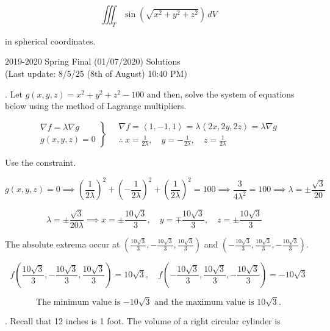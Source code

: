 \documentclass{article}
\begin{document}
\[\iiint_T\sin\left(\sqrt{x^2+y^2+z^2}\right)\,dV\]

\hfill

\noindent in spherical coordinates.

\newpage

\begin{center}
2019-2020 Spring Final (01/07/2020) Solutions\\
(Last update: 8/5/25 (8th of August) 10:40 PM)
\end{center}

. Let $g(x,y,z)=x^2+y^2+z^2-100$ and then, solve the system of equations below using the method of Lagrange multipliers.

\[
\left.
\begin{array}{l}
\displaystyle\nabla f=\lambda\nabla g\\
\displaystyle g(x,y,z)=0
\end{array}
\right\}\quad\begin{array}{c}
\nabla f=\left\langle1,-1,1\right\rangle=\lambda\left\langle2x,2y,2z\right\rangle=\lambda\nabla g\\[1em]\displaystyle\therefore\: x=\frac1{2\lambda},\quad y=-\frac1{2\lambda},\quad z=\frac1{2\lambda}
\end{array}
\]

\hfill

\noindent Use the constraint.

\[g(x,y,z)=0\implies\left(\frac1{2\lambda}\right)^2+\left(-\frac1{2\lambda}\right)^2+\left(\frac1{2\lambda}\right)^2=100\implies\frac3{4\lambda^2}=100\implies\lambda=\pm\frac{\sqrt3}{20}\]

\[\lambda=\pm\frac{\sqrt3}{20\lambda}\implies x=\pm\frac{10\sqrt3}3,\quad y=\mp\frac{10\sqrt3}3,\quad z=\pm\frac{10\sqrt3}3\quad\]

\hfill

\noindent The absolute extrema occur at $\left(\frac{10\sqrt3}3,-\frac{10\sqrt3}3,\frac{10\sqrt3}3\right)$ and $\left(-\frac{10\sqrt3}3,\frac{10\sqrt3}3,-\frac{10\sqrt3}3\right)$.

\[f\left(\frac{10\sqrt3}3,-\frac{10\sqrt3}3,\frac{10\sqrt3}3\right)=10\sqrt3,\quad f\left(-\frac{10\sqrt3}3,\frac{10\sqrt3}3,-\frac{10\sqrt3}3\right)=-10\sqrt3\]

\[\boxed{\text{The minimum value is }{-10\sqrt3}\text{ and the maximum value is }10\sqrt3.}\]

\hfill

. Recall that 12 inches is 1 foot. The volume of a right circular cylinder is
\end{document}
